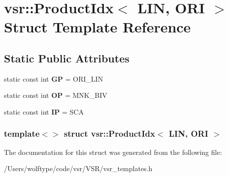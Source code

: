 \hypertarget{structvsr_1_1_product_idx_3_01_l_i_n_00_01_o_r_i_01_4}{\section{vsr\-:\-:Product\-Idx$<$ L\-I\-N, O\-R\-I $>$ Struct Template Reference}
\label{structvsr_1_1_product_idx_3_01_l_i_n_00_01_o_r_i_01_4}
}
\subsection*{Static Public Attributes}
\begin{DoxyCompactItemize}
\item 
\hypertarget{structvsr_1_1_product_idx_3_01_l_i_n_00_01_o_r_i_01_4_ae4bf8a73ddddda01e614bf4d7fb177f6}{static const int {\bfseries G\-P} = O\-R\-I\-\_\-\-L\-I\-N}\label{structvsr_1_1_product_idx_3_01_l_i_n_00_01_o_r_i_01_4_ae4bf8a73ddddda01e614bf4d7fb177f6}

\item 
\hypertarget{structvsr_1_1_product_idx_3_01_l_i_n_00_01_o_r_i_01_4_a0f25da69924559dee03de7a582b98790}{static const int {\bfseries O\-P} = M\-N\-K\-\_\-\-B\-I\-V}\label{structvsr_1_1_product_idx_3_01_l_i_n_00_01_o_r_i_01_4_a0f25da69924559dee03de7a582b98790}

\item 
\hypertarget{structvsr_1_1_product_idx_3_01_l_i_n_00_01_o_r_i_01_4_a6ded7cfca5dbfd502cccb014c290627a}{static const int {\bfseries I\-P} = S\-C\-A}\label{structvsr_1_1_product_idx_3_01_l_i_n_00_01_o_r_i_01_4_a6ded7cfca5dbfd502cccb014c290627a}

\end{DoxyCompactItemize}
\subsubsection*{template$<$$>$ struct vsr\-::\-Product\-Idx$<$ L\-I\-N, O\-R\-I $>$}



The documentation for this struct was generated from the following file\-:\begin{DoxyCompactItemize}
\item 
/\-Users/wolftype/code/vsr/\-V\-S\-R/vsr\-\_\-templates.\-h\end{DoxyCompactItemize}
